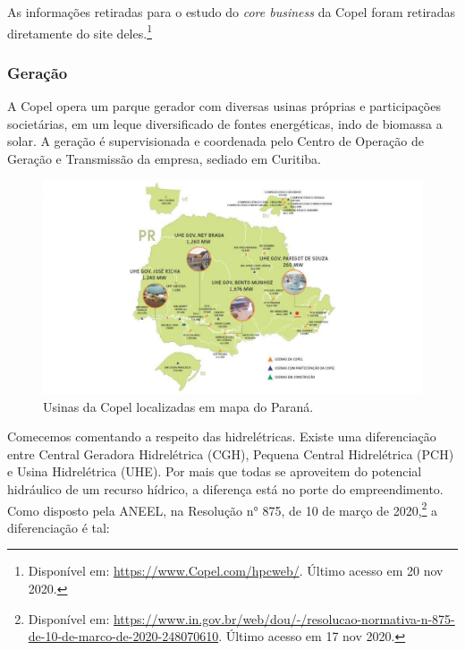 \documentclass[grad,numbers]{coppe}
\begin{document}
  As informações retiradas para o estudo do \emph{core business} da Copel foram retiradas diretamente do site deles.\footnote{Disponível em: \url{https://www.Copel.com/hpcweb/}. Último acesso em 20 nov 2020.}

  \hypertarget{gerauxe7uxe3o}{%
  \subsubsection{Geração}\label{gerauxe7uxe3o}}

  A Copel opera um parque gerador com diversas usinas próprias e participações societárias, em um leque diversificado de fontes energéticas, indo de biomassa a solar. A geração é supervisionada e coordenada pelo Centro de Operação de Geração e Transmissão da empresa, sediado em Curitiba.
  \begin{figure}[H]
  \includegraphics[width=1\linewidth]{img/usinas_Copel} \caption{Usinas da Copel localizadas em mapa do Paraná.}\label{fig:unnamed-chunk-1}
  \end{figure}
  Comecemos comentando a respeito das hidrelétricas. Existe uma diferenciação entre Central Geradora Hidrelétrica (CGH), Pequena Central Hidrelétrica (PCH) e Usina Hidrelétrica (UHE). Por mais que todas se aproveitem do potencial hidráulico de um recurso hídrico, a diferença está no porte do empreendimento. Como disposto pela ANEEL, na Resolução n° 875, de 10 de março de 2020,\footnote{Disponível em: \url{https://www.in.gov.br/web/dou/-/resolucao-normativa-n-875-de-10-de-marco-de-2020-248070610}. Último acesso em 17 nov 2020.} a diferenciação é tal:
\end{document}
